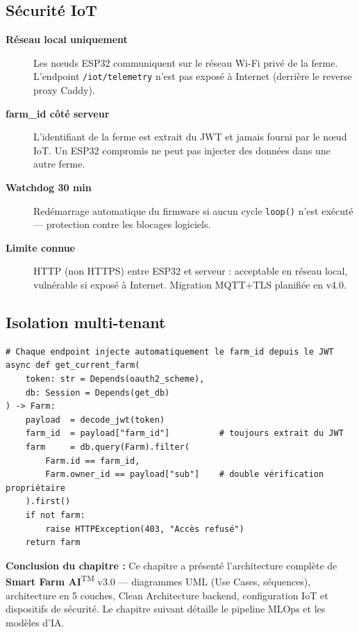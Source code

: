 \documentclass[12pt,a4paper,oneside]{report}
\newcommand{\farmAI}{\textbf{Smart Farm AI}\textsuperscript{TM}}
\newcommand{\api}[1]{\texttt{\color{farmblue}\small#1}}
\newcommand{\code}[1]{\texttt{\small\color{farmgray}#1}}
\begin{document}
\subsection{Sécurité IoT}

\begin{tcolorbox}[warningbox,title={Modèle de menace IoT — Surface d'attaque ESP32}]
\begin{description}
  \item[\textbf{Réseau local uniquement}] Les nœuds ESP32 communiquent sur le réseau
        Wi-Fi privé de la ferme. L'endpoint \api{/iot/telemetry} n'est pas exposé à
        Internet (derrière le reverse proxy Caddy).
  \item[\textbf{farm\_id côté serveur}] L'identifiant de la ferme est extrait du JWT
        et jamais fourni par le nœud IoT. Un ESP32 compromis ne peut pas injecter des
        données dans une autre ferme.
  \item[\textbf{Watchdog 30 min}] Redémarrage automatique du firmware si aucun cycle
        \code{loop()} n'est exécuté — protection contre les blocages logiciels.
  \item[\textbf{Limite connue}] HTTP (non HTTPS) entre ESP32 et serveur : acceptable
        en réseau local, vulnérable si exposé à Internet. Migration MQTT+TLS planifiée
        en v4.0.
\end{description}
\end{tcolorbox}

\subsection{Isolation multi-tenant}

\begin{lstlisting}[style=pythonstyle,caption={Isolation multi-tenant — FastAPI Depends},label={lst:tenant}]
# Chaque endpoint injecte automatiquement le farm_id depuis le JWT
async def get_current_farm(
    token: str = Depends(oauth2_scheme),
    db: Session = Depends(get_db)
) -> Farm:
    payload  = decode_jwt(token)
    farm_id  = payload["farm_id"]          # toujours extrait du JWT
    farm     = db.query(Farm).filter(
        Farm.id == farm_id,
        Farm.owner_id == payload["sub"]    # double vérification propriétaire
    ).first()
    if not farm:
        raise HTTPException(403, "Accès refusé")
    return farm
\end{lstlisting}

\noindent\textbf{Conclusion du chapitre :} Ce chapitre a présenté l'architecture
complète de \farmAI{} v3.0 — diagrammes UML (Use Cases, séquences), architecture en
5 couches, Clean Architecture backend, configuration IoT et dispositifs de sécurité.
Le chapitre suivant détaille le pipeline MLOps et les modèles d'IA.
\end{document}
